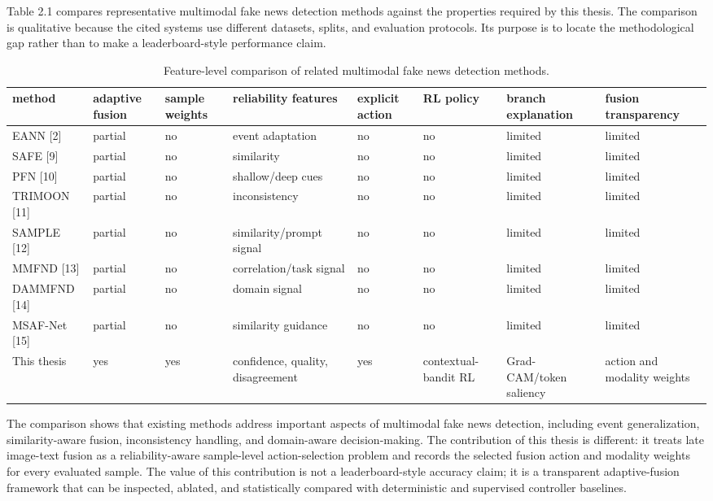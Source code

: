 Table 2.1 compares representative multimodal fake news detection methods against the properties required by this thesis. The comparison is qualitative because the cited systems use different datasets, splits, and evaluation protocols. Its purpose is to locate the methodological gap rather than to make a leaderboard-style performance claim.

\begin{table}[H]
\centering
\tiny
\caption{Feature-level comparison of related multimodal fake news detection methods.}
\label{tab:related_method_feature_comparison}
\begin{tabularx}{\textwidth}{YYYYYYYY}
\toprule
method & adaptive fusion & sample weights & reliability features & explicit action & RL policy & branch explanation & fusion transparency \\
\midrule
EANN [2] & partial & no & event adaptation & no & no & limited & limited \\
SAFE [9] & partial & no & similarity & no & no & limited & limited \\
PFN [10] & partial & no & shallow/deep cues & no & no & limited & limited \\
TRIMOON [11] & partial & no & inconsistency & no & no & limited & limited \\
SAMPLE [12] & partial & no & similarity/prompt signal & no & no & limited & limited \\
MMFND [13] & partial & no & correlation/task signal & no & no & limited & limited \\
DAMMFND [14] & partial & no & domain signal & no & no & limited & limited \\
MSAF-Net [15] & partial & no & similarity guidance & no & no & limited & limited \\
This thesis & yes & yes & confidence, quality, disagreement & yes & contextual-bandit RL & Grad-CAM/token saliency & action and modality weights \\
\bottomrule
\end{tabularx}
\end{table}

The comparison shows that existing methods address important aspects of multimodal fake news detection, including event generalization, similarity-aware fusion, inconsistency handling, and domain-aware decision-making. The contribution of this thesis is different: it treats late image-text fusion as a reliability-aware sample-level action-selection problem and records the selected fusion action and modality weights for every evaluated sample. The value of this contribution is not a leaderboard-style accuracy claim; it is a transparent adaptive-fusion framework that can be inspected, ablated, and statistically compared with deterministic and supervised controller baselines.

